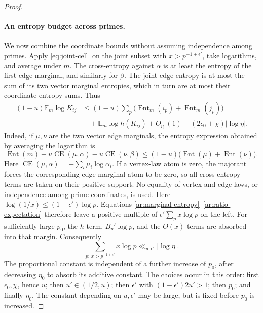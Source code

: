 \begin{proof}
\paragraph{An entropy budget across primes.}
We now combine the coordinate bounds without assuming independence
among primes. Apply \eqref{eq:joint-cell} on the joint subset with
$x>p^{-1+\epsilon'}$, take logarithms, and average under $m$.
The cross-entropy against $\alpha$ is at least the entropy of the first
edge marginal, and similarly for $\beta$. The joint edge entropy is at
most the sum of its two vector marginal entropies, which in turn are
at most their coordinate entropy sums. Thus
\begin{align*}
 (1-u)\mathbb E_m\log K_{ij}
 &\le (1-u)\sum_p
   \bigl(\operatorname{Ent}_m(i_p)+\operatorname{Ent}_m(j_p)\bigr)\\
 &\quad+\mathbb E_m\log h(K_{ij})
       +O_{p_0}(1)+(2\epsilon_0+\chi)|\log\eta|.
\end{align*}
Indeed, if $\mu,\nu$ are the two vector edge marginals, the entropy
expression obtained by averaging the logarithm is
\[
 \operatorname{Ent}(m)-u\operatorname{CE}(\mu,\alpha)
                         -u\operatorname{CE}(\nu,\beta)
 \le(1-u)\bigl(\operatorname{Ent}(\mu)+\operatorname{Ent}(\nu)\bigr).
\]
Here $\operatorname{CE}(\mu,\alpha)=-\sum_i\mu_i\log\alpha_i$.
If a vertex-law atom is zero, the majorant forces the corresponding
edge marginal atom to be zero, so all cross-entropy terms are taken on
their positive support. No equality of vertex and edge laws, or
independence among prime coordinates, is used.
Here $\log(1/x)\le(1-\epsilon')\log p$. Equations
\eqref{ar:marginal-entropy}--\eqref{ar:ratio-expectation} therefore
leave a positive multiple of $\epsilon'\sum_px\log p$ on the left.
For sufficiently large $p_0$, the $h$ term, $B_p'\log p$, and the
$O(x)$ terms are absorbed into that margin. Consequently
\begin{equation}\label{ar:entropy-budget}
 \sum_{p:\,x>p^{-1+\epsilon'}}x\log p
 \ll_{u,\epsilon'}|\log\eta|.
\end{equation}
The proportional constant is independent of a further increase of
$p_0$, after decreasing $\eta_0$ to absorb its additive constant.
The choices occur in this order: first $\epsilon_0,\chi$, hence $u$;
then $u'\in(1/2,u)$; then $\epsilon'$ with $(1-\epsilon')2u'>1$;
then $p_0$; and finally $\eta_0$. The constant depending on
$u,\epsilon'$ may be large, but is fixed before $p_0$ is increased.


\end{proof}
